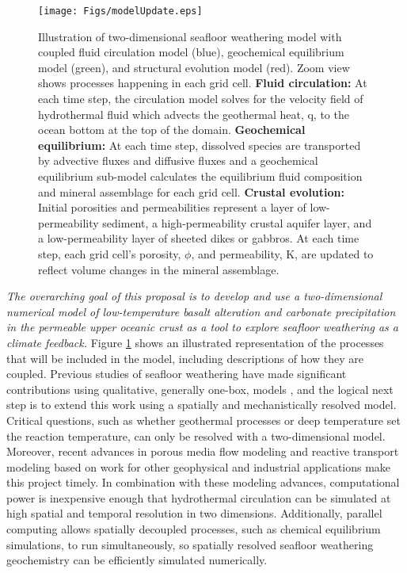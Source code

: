 \documentclass[authoryear,round,12pt]{article}
\begin{document}
\begin{figure}[!hb]
\begin{center}
\texttt{[image: Figs/modelUpdate.eps]}
\end{center}
\caption{Illustration of two-dimensional seafloor weathering model
  with coupled fluid circulation model (blue), geochemical equilibrium
  model (green), and structural evolution model (red). Zoom view shows
  processes happening in each grid cell. \textbf{Fluid circulation:}
  At each time step, the circulation model solves for the velocity
  field of hydrothermal fluid which advects the geothermal heat, q, to
  the ocean bottom at the top of the domain. \textbf{Geochemical
    equilibrium:} At each time step, dissolved species are transported
  by advective fluxes and diffusive fluxes and a geochemical
  equilibrium sub-model \citep[PHREEQC,][]{phreeqc2013} calculates the
  equilibrium fluid composition and mineral assemblage for each grid
  cell. \textbf{Crustal evolution:} Initial porosities and
  permeabilities represent a layer of low-permeability sediment, a
  high-permeability crustal aquifer layer, and a low-permeability
  layer of sheeted dikes or gabbros. At each time step, each grid
  cell's porosity, $\phi$, and permeability, K, are updated to reflect
  volume changes in the mineral assemblage.}
\label{fig:model}
\end{figure}


\textit{The overarching goal of this proposal is to develop and use a 
two-dimensional numerical model of low-temperature basalt alteration 
and carbonate precipitation in the permeable upper oceanic crust as a 
tool to explore seafloor weathering as a climate feedback.} 
Figure \ref{fig:model} shows an illustrated
representation of the processes that will be included in the model,
including descriptions of how they are coupled. Previous studies of
seafloor weathering have made significant contributions using
qualitative, generally one-box, models \citep{caldeira1995, sleep2001,
  lehir2008, coogan2013}, and the logical next step is to extend this
work using a spatially and mechanistically resolved model. Critical questions, such as
whether geothermal processes or deep temperature set the
reaction temperature, can only be resolved with a two-dimensional
model. Moreover, recent advances in porous media flow modeling and
reactive transport modeling based on work for other geophysical and
industrial applications make this project timely.  In combination with
these modeling advances, computational power is inexpensive enough
that hydrothermal circulation can be simulated at high spatial and
temporal resolution in two dimensions. Additionally, parallel
computing allows spatially decoupled processes, such as chemical
equilibrium simulations, to run simultaneously, so spatially resolved
seafloor weathering geochemistry can be efficiently simulated
numerically.
\end{document}
